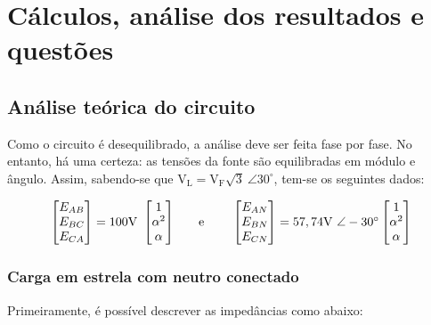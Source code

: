 \documentclass[a4paper,12pt,oneside,openany,table,xcdraw]{article}
\begin{document}
\section{Cálculos, análise dos resultados e questões} %

\subsection{Análise teórica do circuito}
Como o circuito é desequilibrado, a análise deve ser feita fase por fase. No entanto, há uma certeza: as tensões da fonte são equilibradas em módulo e ângulo. Assim, sabendo-se que $\mathrm{V_{L} =V_{F}\sqrt{3} \ \angle 30^{\circ }}$, tem-se os seguintes dados:

\vspace{-0.4cm}
\begin{equation*}
\begin{array}{ c c c }
\mathrm{\begin{bmatrix}
E_{AB}\\
E_{BC}\\
E_{CA}
\end{bmatrix} =100V\ \begin{bmatrix}
1\\
\alpha ^{2}\\
\alpha 
\end{bmatrix}} & \quad \text{e} \quad \  & \mathrm{\begin{bmatrix}
E_{AN}\\
E_{BN}\\
E_{CN}
\end{bmatrix} =57,74V\ \angle -30^{\circ } \begin{bmatrix}
1\\
\alpha ^{2}\\
\alpha 
\end{bmatrix}}
\end{array}
\end{equation*}

\vspace{0.2cm}
\subsubsection{Carga em estrela com neutro conectado} \label{m1:teoria}
Primeiramente, é possível descrever as impedâncias como abaixo:
\end{document}
